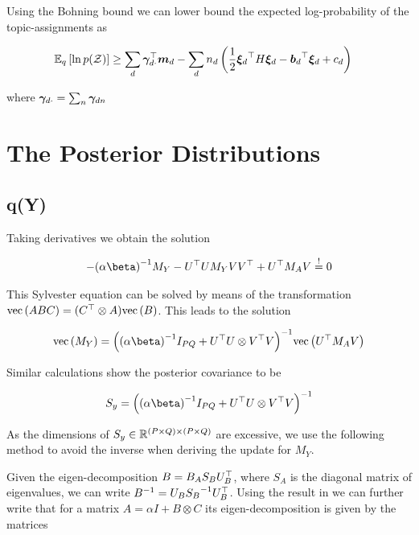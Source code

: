 Using the Bohning bound\cite{Bohning1988} we can lower bound the expected log-probability of the topic-assignments as

\begin{equation}
\begin{split}
\ex{\ln p(\mathcal{Z})}{q} 
    & \geq \sum_d \vv{\gamma}_{d\cdot}\T \md
      - \sum_d n_d \left( \half \ed\T H \ed - \bd \T \ed + c_d \right)
\end{split}
\end{equation}

where $\vv{\gamma}_{d\cdot} = \sum_n \gdn$


\section{The Posterior Distributions}

\subsection{q(Y)}
Taking derivatives we obtain the solution

\begin{align}
-\invb{\alpha \beta} M_Y - U\T U M_Y V V\T + U\T M_A V \mbeq 0
\end{align}

This Sylvester equation can be solved by means of the transformation $\vecf{ABC} = (C\T \otimes A)\vecf{B}$. This leads to the solution

\begin{align}
\vecf{M_Y} = \invb{\invb{\alpha \beta} I_{PQ} + U\T U \otimes V\T V}\vecf{U\T M_A V} \label{eqn:dumb-y-soln}
\end{align}


Similar calculations show the posterior covariance to be 

\begin{align}
S_y = \invb{\invb{\alpha \beta} I_{PQ} + U\T U \otimes V\T V}
\end{align}

As the dimensions of $S_y \in \MReal{(P\times Q)}{(P \times Q)}$ are excessive, we use the following method to avoid the inverse when deriving the update for $M_Y$.

Given the eigen-decomposition $B = B_A S_B U_B\T$, where $S_A$ is the diagonal matrix of eigenvalues, we can write $\inv{B} = U_B \inv{S_B} U_B\T$. Using the result in \cite{Stegle2011} we can further write that for a matrix $A = \alpha I + B \otimes C$ its eigen-decomposition is given by the matrices

